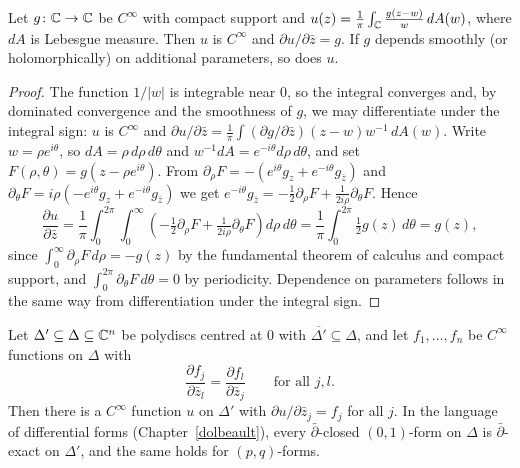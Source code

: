 \begin{lemma}\label{several-complex-variables:lemma-cauchy-transform}
Let $g \colon \mathbb{C} \to \mathbb{C}$ be $C^\infty$ with compact support and $u(z) = \frac{1}{\pi}\int_{\mathbb{C}}\frac{g(z - w)}{w}\,dA(w)$, where $dA$ is Lebesgue measure. Then $u$ is $C^\infty$ and
$\partial u/\partial\bar z = g$. If $g$ depends smoothly (or holomorphically) on additional parameters, so does $u$.
\end{lemma}

\begin{proof}
The function $1/|w|$ is integrable near $0$, so the integral converges and, by dominated convergence and the smoothness of $g$, we may differentiate under the integral sign: $u$ is $C^\infty$ and
$\partial u/\partial\bar z = \frac1\pi\int(\partial g/\partial\bar z)(z - w)w^{-1}\,dA(w)$. Write $w = \rho e^{i\theta}$, so $dA = \rho\,d\rho\,d\theta$ and $w^{-1}dA = e^{-i\theta}d\rho\,d\theta$, and set
$F(\rho, \theta) = g(z - \rho e^{i\theta})$. From $\partial_\rho F = -(e^{i\theta}g_z + e^{-i\theta}g_{\bar z})$ and $\partial_\theta F = i\rho(-e^{i\theta}g_z + e^{-i\theta}g_{\bar z})$ we get
$e^{-i\theta}g_{\bar z} = -\tfrac12\partial_\rho F + \tfrac{1}{2i\rho}\partial_\theta F$. Hence
\[
\frac{\partial u}{\partial\bar z} = \frac1\pi\int_0^{2\pi}\int_0^\infty\left(-\tfrac12\partial_\rho F + \tfrac{1}{2i\rho}\partial_\theta F\right)d\rho\,d\theta = \frac1\pi\int_0^{2\pi}\tfrac12 g(z)\,d\theta = g(z),
\]
since $\int_0^\infty\partial_\rho F\,d\rho = -g(z)$ by the fundamental theorem of calculus and compact support, and $\int_0^{2\pi}\partial_\theta F\,d\theta = 0$ by periodicity. Dependence on parameters
follows in the same way from differentiation under the integral sign.
\end{proof}

\begin{theorem}\label{several-complex-variables:theorem-dbar-poincare}
Let $\Delta' \subseteq \Delta \subseteq \mathbb{C}^n$ be polydiscs centred at $0$ with $\overline{\Delta'} \subseteq \Delta$, and let $f_1, \ldots, f_n$ be $C^\infty$ functions on $\Delta$ with
\[
\frac{\partial f_j}{\partial\bar z_l} = \frac{\partial f_l}{\partial\bar z_j} \qquad \text{for all } j, l.
\]
Then there is a $C^\infty$ function $u$ on $\Delta'$ with $\partial u/\partial\bar z_j = f_j$ for all $j$. In the language of differential forms (Chapter~\ref{dolbeault}), every $\bar\partial$-closed
$(0,1)$-form on $\Delta$ is $\bar\partial$-exact on $\Delta'$, and the same holds for $(p, q)$-forms.
\end{theorem}


